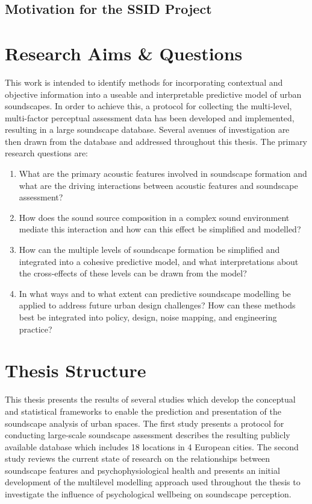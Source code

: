 \subsection{Motivation for the SSID Project}

\section{Research Aims \& Questions}
This work is intended to identify methods for incorporating contextual and objective information into a useable and interpretable predictive model of urban soundscapes. In order to achieve this, a protocol for collecting the multi-level, multi-factor perceptual assessment data has been developed and implemented, resulting in a large soundscape database. Several avenues of investigation are then drawn from the database and addressed throughout this thesis. The primary research questions are:

\begin{enumerate}
  \item What are the primary acoustic features involved in soundscape formation and what are the driving interactions between acoustic features and soundscape assessment?
  \item How does the sound source composition in a complex sound environment mediate this interaction and how can this effect be simplified and modelled?
  \item How can the multiple levels of soundscape formation be simplified and integrated into a cohesive predictive model, and what interpretations about the cross-effects of these levels can be drawn from the model?
  \item In what ways and to what extent can predictive soundscape modelling be applied to address future urban design challenges? How can these methods best be integrated into policy, design, noise mapping, and engineering practice?
\end{enumerate}


\section{Thesis Structure}

This thesis presents the results of several studies which develop the conceptual and statistical frameworks to enable the prediction and presentation of the soundscape analysis of urban spaces. The first study presents a protocol for conducting large-scale soundscape assessment describes the resulting publicly available database which includes 18 locations in 4 European cities. The second study reviews the current state of research on the relationships between soundscape features and psychophysiological health and presents an initial development of the multilevel modelling approach used throughout the thesis to investigate the influence of psychological wellbeing on soundscape perception.

